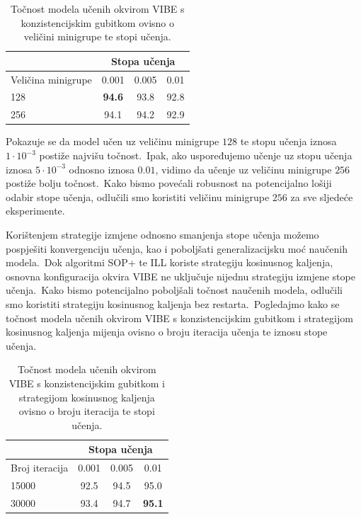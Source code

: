 \documentclass[diplomskirad]{fer}
\begin{document}
\begin{table}[htb]
  \caption{Točnost modela učenih okvirom VIBE s konzistencijskim gubitkom ovisno o veličini minigrupe te stopi učenja.}
  \label{tbl:usporedba_vel_minigrupe}
  \centering
  \begin{tabular}{l||ccc}
  & \multicolumn{3}{c}{Stopa učenja} \\ \hline
  Veličina minigrupe & 0.001 & 0.005 & 0.01 \\ \hline \hline
  128 & \textbf{94.6} & 93.8 & 92.8 \\ 
  256 & 94.1 & 94.2 & 92.9 \\
  \end{tabular}
\end{table}

Pokazuje se da model učen uz veličinu minigrupe $128$ te stopu učenja iznosa $1 \cdot 10^{-3}$ postiže najvišu točnost.\ 
Ipak, ako uspoređujemo učenje uz stopu učenja iznosa $5 \cdot 10^{-3}$ odnosno iznosa $0.01$, vidimo da učenje uz veličinu minigrupe $256$ postiže bolju točnost.\ 
Kako bismo povećali robusnost na potencijalno lošiji odabir stope učenja, odlučili smo koristiti veličinu minigrupe $256$ za sve sljedeće eksperimente.\ 

Korištenjem strategije izmjene odnosno smanjenja stope učenja možemo pospješiti konvergenciju učenja, kao i poboljšati generalizacijsku moć naučenih modela.\ 
Dok algoritmi SOP+ te ILL koriste strategiju kosinusnog kaljenja, osnovna konfiguracija okvira VIBE ne uključuje nijednu strategiju izmjene stope učenja.\ 
Kako bismo potencijalno poboljšali točnost naučenih modela, odlučili smo koristiti strategiju kosinusnog kaljenja bez restarta.\ 
Pogledajmo kako se točnost modela učenih okvirom VIBE s konzistencijskim gubitkom i strategijom kosinusnog kaljenja mijenja ovisno o broju iteracija učenja te iznosu stope učenja.\ 

\begin{table}[htb]
  \caption{Točnost modela učenih okvirom VIBE s konzistencijskim gubitkom i strategijom kosinusnog kaljenja ovisno o broju iteracija te stopi učenja.}
  \label{tbl:usporedba_lr_num_iter_con_loss_lr_scheduler}
  \centering
  \begin{tabular}{l||ccc}
  & \multicolumn{3}{c}{Stopa učenja} \\ \hline
  Broj iteracija & 0.001 & 0.005 & 0.01 \\ \hline \hline
  15000 & 92.5 & 94.5 & 95.0 \\
  30000 & 93.4 & 94.7 & \textbf{95.1} \\ 
  \end{tabular}
\end{table}
\end{document}
